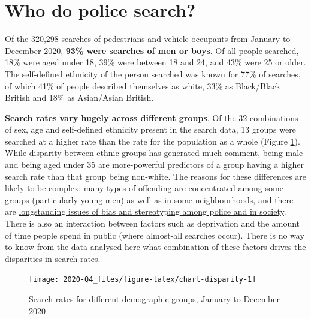 \documentclass[
  a4paper,
  twoside, 11pt]{article}
\begin{document}
\hypertarget{who-do-police-search}{%
\section{Who do police search?}\label{who-do-police-search}}

Of the 320,298 searches of pedestrians and vehicle occupants from January to December 2020, \textbf{93\% were searches of men or boys}. Of all people searched, 18\% were aged under 18, 39\% were between 18 and 24, and 43\% were 25 or older. The self-defined ethnicity of the person searched was known for 77\% of searches, of which 41\% of people described themselves as white, 33\% as Black/Black British and 18\% as Asian/Asian British.

\textbf{Search rates vary hugely across different groups}. Of the 32 combinations of sex, age and self-defined ethnicity present in the search data, 13 groups were searched at a higher rate than the rate for the population as a whole (Figure \ref{fig:chart-disparity}). While disparity between ethnic groups has generated much comment, being male and being aged under 35 are more-powerful predictors of a group having a higher search rate than that group being non-white. The reasons for these differences are likely to be complex: many types of offending are concentrated among some groups (particularly young men) as well as in some neighbourhoods, and there are \href{https://www.bbc.co.uk/news/uk-47300343}{longstanding issues of bias and stereotyping among police and in society}. There is also an interaction between factors such as deprivation and the amount of time people spend in public (where almost-all searches occur). There is no way to know from the data analysed here what combination of these factors drives the disparities in search rates.



\begin{figure}[tb]

{\centering \texttt{[image: 2020-Q4\_files/figure-latex/chart-disparity-1]} 

}

\caption{Search rates for different demographic groups, January to December 2020}\label{fig:chart-disparity}
\end{figure}
\end{document}
